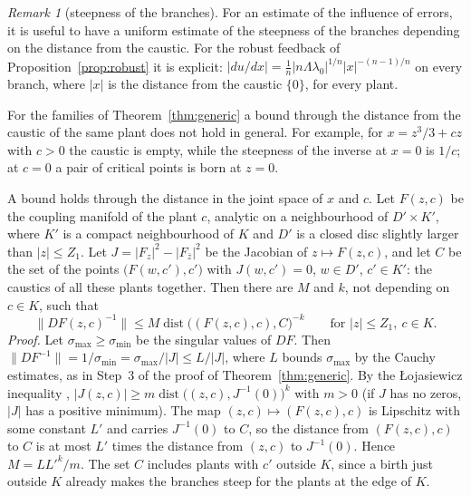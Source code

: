 \documentclass[11pt,reqno]{amsart}
\theoremstyle{plain}
\theoremstyle{definition}
\theoremstyle{remark}
\newtheorem*{remark}{Remark}
\begin{document}
\begin{remark}[steepness of the branches]\label{rem:steep}
For an estimate of the influence of errors, it is useful to have a uniform estimate of the steepness of the branches depending on the distance from the caustic. For the robust feedback of Proposition~\ref{prop:robust} it is explicit: $|du/dx|=\frac1n|n\Lambda\lambda_0|^{1/n}|x|^{-(n-1)/n}$ on every branch, where $|x|$ is the distance from the caustic $\{0\}$, for every plant.

For the families of Theorem~\ref{thm:generic} a bound through the distance from the caustic of the same plant does not hold in general. For example, for $x=z^{3}/3+cz$ with $c>0$ the caustic is empty, while the steepness of the inverse at $x=0$ is $1/c$; at $c=0$ a pair of critical points is born at $z=0$.

A bound holds through the distance in the joint space of $x$ and $c$. Let $F(z,c)$ be the coupling manifold of the plant $c$, analytic on a neighbourhood of $D'\times K'$, where $K'$ is a compact neighbourhood of $K$ and $D'$ is a closed disc slightly larger than $|z|\le Z_1$. Let $J=|F_z|^{2}-|F_{\bar z}|^{2}$ be the Jacobian of $z\mapsto F(z,c)$, and let $C$ be the set of the points $\bigl(F(w,c'),c'\bigr)$ with $J(w,c')=0$, $w\in D'$, $c'\in K'$: the caustics of all these plants together. Then there are $M$ and $k$, not depending on $c\in K$, such that
\[
  \|DF(z,c)^{-1}\|\le M\operatorname{dist}\bigl((F(z,c),c),C\bigr)^{-k}\qquad\text{for }|z|\le Z_1,\ c\in K .
\]
\emph{Proof.} Let $\sigma_{\max}\ge\sigma_{\min}$ be the singular values of $DF$. Then $\|DF^{-1}\|=1/\sigma_{\min}=\sigma_{\max}/|J|\le L/|J|$, where $L$ bounds $\sigma_{\max}$ by the Cauchy estimates, as in Step~3 of the proof of Theorem~\ref{thm:generic}. By the \L{}ojasiewicz inequality \cite{Lojasiewicz1959}, $|J(z,c)|\ge m\operatorname{dist}\bigl((z,c),J^{-1}(0)\bigr)^{k}$ with $m>0$ (if $J$ has no zeros, $|J|$ has a positive minimum). The map $(z,c)\mapsto(F(z,c),c)$ is Lipschitz with some constant $L'$ and carries $J^{-1}(0)$ to $C$, so the distance from $(F(z,c),c)$ to $C$ is at most $L'$ times the distance from $(z,c)$ to $J^{-1}(0)$. Hence $M=LL'^{k}/m$. The set $C$ includes plants with $c'$ outside $K$, since a birth just outside $K$ already makes the branches steep for the plants at the edge of $K$.
\end{remark}
\end{document}
